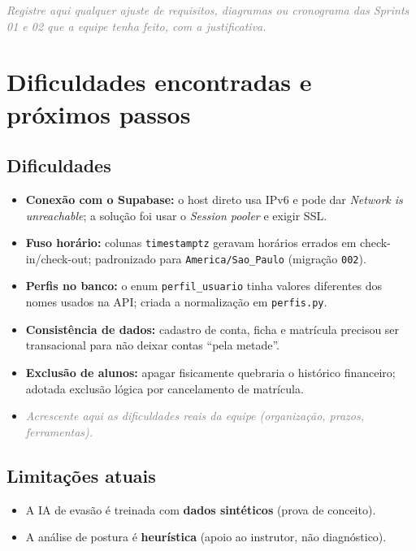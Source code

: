 \documentclass[11pt,a4paper,final]{article}
\newcommand{\cod}[1]{\texttt{#1}}
\newcommand{\preencher}[1]{\textit{\textcolor{gray}{#1}}}
\begin{document}
\preencher{Registre aqui qualquer ajuste de requisitos, diagramas ou cronograma das Sprints 01 e 02 que a
equipe tenha feito, com a justificativa.}

\section{Dificuldades encontradas e próximos passos}

\subsection{Dificuldades}

\begin{itemize}
  \item \textbf{Conexão com o Supabase:} o host direto usa IPv6 e pode dar \textit{Network is
        unreachable}; a solução foi usar o \textit{Session pooler} e exigir SSL.
  \item \textbf{Fuso horário:} colunas \cod{timestamptz} geravam horários errados em check-in/check-out;
        padronizado para \cod{America/Sao\_Paulo} (migração \cod{002}).
  \item \textbf{Perfis no banco:} o enum \cod{perfil\_usuario} tinha valores diferentes dos nomes usados
        na API; criada a normalização em \cod{perfis.py}.
  \item \textbf{Consistência de dados:} cadastro de conta, ficha e matrícula precisou ser transacional
        para não deixar contas ``pela metade''.
  \item \textbf{Exclusão de alunos:} apagar fisicamente quebraria o histórico financeiro; adotada
        exclusão lógica por cancelamento de matrícula.
  \item \preencher{Acrescente aqui as dificuldades reais da equipe (organização, prazos, ferramentas).}
\end{itemize}

\subsection{Limitações atuais}

\begin{itemize}
  \item A IA de evasão é treinada com \textbf{dados sintéticos} (prova de conceito).
  \item A análise de postura é \textbf{heurística} (apoio ao instrutor, não diagnóstico).
\end{itemize}
\end{document}
